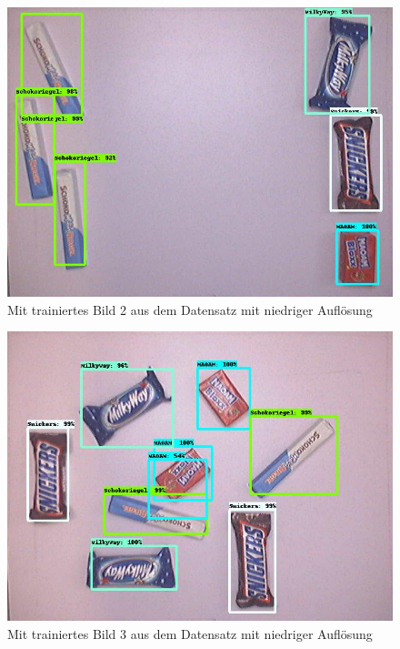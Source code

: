     \begin{figure}[H]
        \centering
        \includegraphics[angle = 90, width = \textwidth]{Bilder/models/model_comparison/efficientdet_d1_coco17_tpu-32/trained_2.jpg}
        \caption{Mit trainiertes Bild 2 aus dem Datensatz mit niedriger Auflösung}
    \end{figure}
    
    \begin{figure}[H]
        \centering
        \includegraphics[angle = 90, width = \textwidth]{Bilder/models/model_comparison/efficientdet_d1_coco17_tpu-32/trained_3.jpg}
        \caption{Mit trainiertes Bild 3 aus dem Datensatz mit niedriger Auflösung}
    \end{figure}
    
